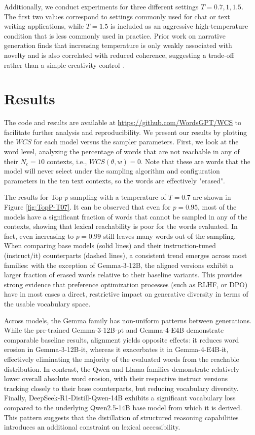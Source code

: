 \documentclass{article}
\begin{document}
Additionally, we conduct experiments for three different settings $T = 0.7,1,1.5$. The first two values correspond to settings commonly used for chat or text writing applications, while $T=1.5$ is included as an aggressive high-temperature condition that is less commonly used in practice. Prior work on narrative generation finds that increasing temperature is only weakly associated with novelty and is also correlated with reduced coherence, suggesting a trade-off rather than a simple creativity control \cite{peeperkorn2024temperature}.


\section{Results}
\label{sec::results}

The code and results are available at \url{https://github.com/WordsGPT/WCS} to facilitate further analysis and reproducibility. We present our results by plotting the $WCS$ for each model versus the sampler parameters. First, we look at the word level, analyzing the percentage of words that are not reachable in any of their $N_c=10$ contexts, i.e., $WCS(\theta,w)=0$. Note that these are words that the model will never select under the sampling algorithm and configuration parameters in the ten text contexts, so the words are effectively "erased".


The results for Top-$p$ sampling with a temperature of $T=0.7$ are shown in Figure \ref{fig:TopP-T07}. It can be observed that even for $p = 0.95$, most of the models have a significant fraction of words that cannot be sampled in any of the contexts, showing that lexical reachability is poor for the words evaluated. In fact, even increasing to $p = 0.99$ still leaves many words out of the sampling. When comparing base models (solid lines) and their instruction-tuned (instruct/it) counterparts (dashed lines), a consistent trend emerges across most families: with the exception of Gemma-3-12B, the aligned versions exhibit a larger fraction of erased words relative to their baseline variants. This provides strong evidence that preference optimization processes (such as RLHF, or DPO) have in most cases a direct, restrictive impact on generative diversity in terms of the usable vocabulary space. 

Across models, the Gemma family has non-uniform patterns between generations. While the pre-trained Gemma-3-12B-pt and Gemma-4-E4B demonstrate comparable baseline results, alignment yields opposite effects: it reduces word erosion in Gemma-3-12B-it, whereas it exacerbates it in Gemma-4-E4B-it, effectively eliminating the majority of the evaluated words from the reachable distribution. In contrast, the Qwen and Llama families demonstrate relatively lower overall absolute word erosion, with their respective instruct versions tracking closely to their base counterparts, but reducing vocabulary diversity. Finally, DeepSeek-R1-Distill-Qwen-14B exhibits a significant vocabulary loss compared to the underlying Qwen2.5-14B base model from which it is derived. This pattern suggests that the distillation of structured reasoning capabilities introduces an additional constraint on lexical accessibility.
\end{document}
